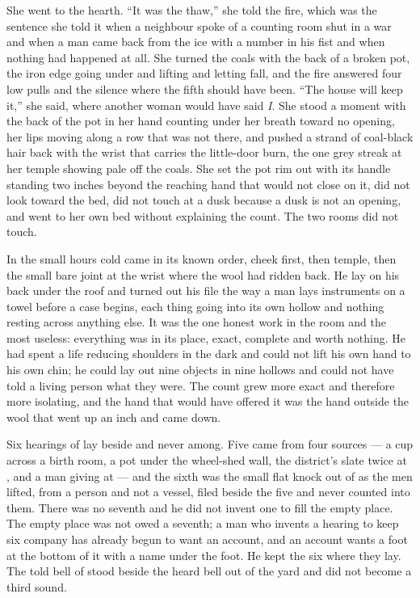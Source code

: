 She went to the hearth. “It was the thaw,” she told the fire, which was the sentence she told it when a neighbour spoke of a counting room shut in a war and when a man came back from the ice with a number in his fist and when nothing had happened at all. She turned the coals with the back of a broken pot, the iron edge going under and lifting and letting fall, and the fire answered four low pulls and the silence where the fifth should have been. “The house will keep it,” she said, where another woman would have said \emph{I}. She stood a moment with the back of the pot in her hand counting under her breath toward no opening, her lips moving along a row that was not there, and pushed a strand of coal-black hair back with the wrist that carries the little-door burn, the one grey streak at her temple showing pale off the coals. She set the pot rim out with its handle standing two inches beyond the reaching hand that would not close on it, did not look toward the bed, did not touch  at a dusk because a dusk is not an opening, and went to her own bed without explaining the count. The two rooms did not touch.

\scenebreak

In the small hours cold came in its known order, cheek first, then temple, then the small bare joint at the wrist where the wool had ridden back. He lay on his back under the roof and turned out his file the way a man lays instruments on a towel before a case begins, each thing going into its own hollow and nothing resting across anything else. It was the one honest work in the room and the most useless: everything was in its place, exact, complete and worth nothing. He had spent a life reducing shoulders in the dark and could not lift his own hand to his own chin; he could lay out nine objects in nine hollows and could not have told a living person what they were. The count grew more exact and therefore more isolating, and the hand that would have offered it was the hand outside the wool that went up an inch and came down.

Six hearings of  lay beside and never among. Five came from four sources --- a cup across a birth room, a pot under the wheel-shed wall, the district's slate twice at , and a man giving at  --- and the sixth was the small flat knock out of  as the men lifted, from a person and not a vessel, filed beside the five and never counted into them. There was no seventh and he did not invent one to fill the empty place. The empty place was not owed a seventh; a man who invents a hearing to keep six company has already begun to want an account, and an account wants a foot at the bottom of it with a name under the foot. He kept the six where they lay. The told bell of  stood beside the heard bell out of the yard and did not become a third sound.

